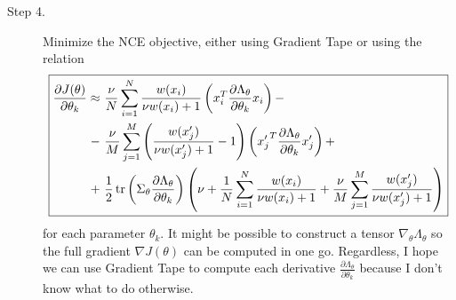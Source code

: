 \documentclass[a4paper]{article}
\begin{document}
\begin{description}
\item[Step 4.] Minimize the NCE objective, either using Gradient Tape or using the relation
$$\boxed{\begin{aligned}
\frac{\partial J(\theta)}{\partial \theta_k} \approx \ &\frac{\nu}{N} \sum_{i=1}^N \frac{w(x_i)}{\nu w(x_i) + 1} \left(x_i^T \frac{\partial \Lambda_\theta}{\partial \theta_k} x_i\right) -\\
- \ &\frac{\nu}{M} \sum_{j=1}^M \left( \frac{w(x_j')}{\nu w(x_j') +  1} - 1\right)  \left( {x_j'}^T  \frac{\partial \Lambda_\theta}{\partial \theta_k} {x_j'} \right)+\\
+ \ &\frac{1}{2}\tr\left( \Sigma_\theta \frac{\partial \Lambda_\theta}{\partial\theta_k}\right) \left(\nu +  \frac{1}{N} \sum_{i=1}^N \frac{w(x_i)}{\nu w(x_i) + 1} + \frac{\nu}{M} \sum_{j=1}^M \frac{w(x_j')}{\nu w(x_j') + 1}\right)
\end{aligned}}$$
for each parameter $\theta_k$. It might be possible to construct a tensor $\nabla_\theta \Lambda_\theta$ so the full gradient $\nabla J(\theta)$ can be computed in one go. Regardless, I hope we can use Gradient Tape to compute each derivative $\frac{\partial \Lambda_\theta}{\partial \theta_k}$ because I don't know what to do otherwise.
\end{description}
\end{document}

